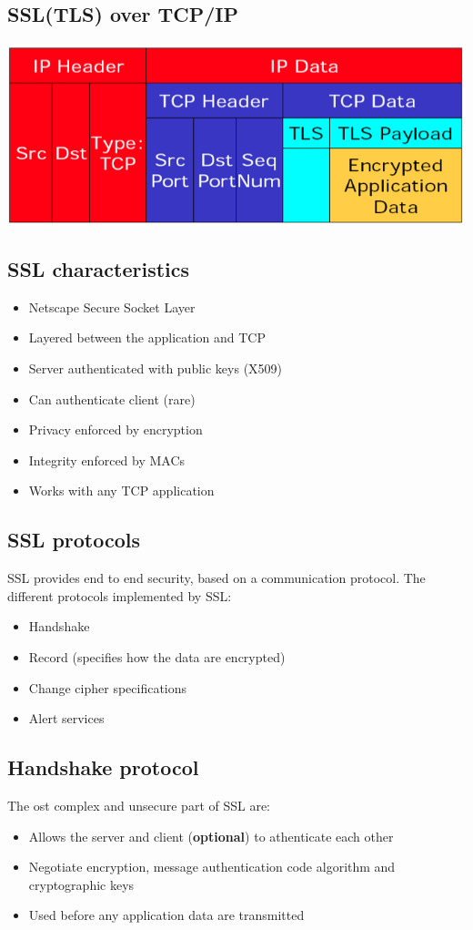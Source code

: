 \documentclass[10pt]{article}
\begin{document}
\subsection{SSL(TLS) over TCP/IP}
\begin{center}
	\includegraphics[scale=0.5]{ssl_tls.png}
\end{center}
\subsection{SSL characteristics}
\begin{itemize}
	\item Netscape Secure Socket Layer
	\item Layered between the application and TCP
	\item Server authenticated with public keys (X509)
	\item Can authenticate client (rare)
	\item Privacy enforced by encryption
	\item Integrity enforced by MACs
	\item Works with any TCP application
\end{itemize}
\subsection{SSL protocols}
SSL provides end to end security, based on a communication protocol. The different protocols implemented by SSL:
\begin{itemize}
	\item Handshake
	\item Record (specifies how the data are encrypted)
	\item Change cipher specifications
	\item Alert services
\end{itemize}
\subsection{Handshake protocol}
The ost complex and unsecure part of SSL are:
\begin{itemize}
	\item Allows the server and client (\textbf{optional}) to athenticate each other
	\item Negotiate encryption, message authentication code algorithm and cryptographic keys
	\item Used before any application data are transmitted
\end{itemize}
\end{document}
